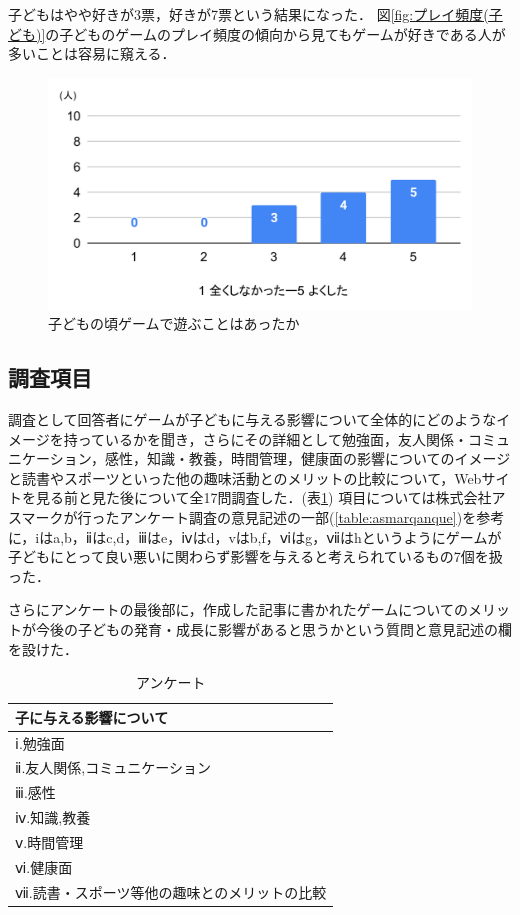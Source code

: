 \documentclass[12pt,a4j,titlepage]{ltjsarticle}
\begin{document}
子どもはやや好きが3票，好きが7票という結果になった．
図\ref{fig:プレイ頻度(子ども)}の子どものゲームのプレイ頻度の傾向から見てもゲームが好きである人が多いことは容易に窺える．

\begin{figure}[H]
 \begin{center}
  \includegraphics[keepaspectratio, scale=0.5]{chart6.pdf}
 \end{center}
 \caption{子どもの頃ゲームで遊ぶことはあったか}
 \label{fig:子どものころ}
\end{figure}

\subsection{調査項目}\label{調査項目}
調査として回答者にゲームが子どもに与える影響について全体的にどのようなイメージを持っているかを聞き，さらにその詳細として勉強面，友人関係・コミュニケーション，感性，知識・教養，時間管理，健康面の影響についてのイメージと読書やスポーツといった他の趣味活動とのメリットの比較について，Webサイトを見る前と見た後について全17問調査した．(表\ref{table:anque})
項目については株式会社アスマークが行ったアンケート調査\cite{gameanq}の意見記述の一部(\ref{table:asmarqanque})を参考に，iはa,b，ⅱはc,d，ⅲはe，ⅳはd，vはb,f，ⅵはg，ⅶはhというようにゲームが子どもにとって良い悪いに関わらず影響を与えると考えられているもの7個を扱った．

さらにアンケートの最後部に，作成した記事に書かれたゲームについてのメリットが今後の子どもの発育・成長に影響があると思うかという質問と意見記述の欄を設けた．

\begin{table}[H]
 \caption{アンケート}
 \label{table:anque}
 \small
 \centering
  \begin{tabular}{l}
  \hline
  子に与える影響について \\
   \hline
   ⅰ.勉強面 \\
   ⅱ.友人関係,コミュニケーション\\
   ⅲ.感性\\
   ⅳ.知識,教養 \\
   ⅴ.時間管理   \\
   ⅵ.健康面 \\
   ⅶ.読書・スポーツ等他の趣味とのメリットの比較 \\
   \hline
  \end{tabular}
\end{table}
\end{document}
